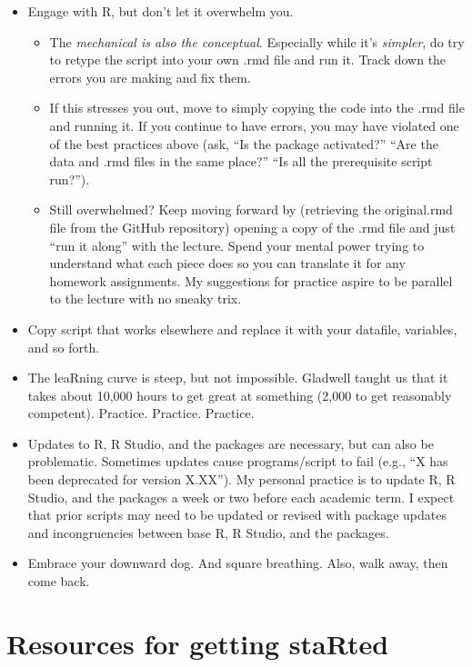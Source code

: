 \documentclass[
  11pt,
]{book}
\providecommand{\tightlist}{%
  \setlength{\itemsep}{0pt}\setlength{\parskip}{0pt}}
\begin{document}
\begin{itemize}
\tightlist
\item
  Engage with R, but don't let it overwhelm you.

  \begin{itemize}
  \tightlist
  \item
    The \emph{mechanical is also the conceptual}. Especially while it's \emph{simpler}, do try to retype the script into your own .rmd file and run it. Track down the errors you are making and fix them.
  \item
    If this stresses you out, move to simply copying the code into the .rmd file and running it. If you continue to have errors, you may have violated one of the best practices above (ask, ``Is the package activated?'' ``Are the data and .rmd files in the same place?'' ``Is all the prerequisite script run?'').
  \item
    Still overwhelmed? Keep moving forward by (retrieving the original.rmd file from the GitHub repository) opening a copy of the .rmd file and just ``run it along'' with the lecture. Spend your mental power trying to understand what each piece does so you can translate it for any homework assignments. My suggestions for practice aspire to be parallel to the lecture with no sneaky trix.
  \end{itemize}
\item
  Copy script that works elsewhere and replace it with your datafile, variables, and so forth.
\item
  The leaRning curve is steep, but not impossible. Gladwell \citeyearpar{gladwell_outliers_2008} taught us that it takes about 10,000 hours to get great at something (2,000 to get reasonably competent). Practice. Practice. Practice.
\item
  Updates to R, R Studio, and the packages are necessary, but can also be problematic. Sometimes updates cause programs/script to fail (e.g., ``X has been deprecated for version X.XX''). My personal practice is to update R, R Studio, and the packages a week or two before each academic term. I expect that prior scripts may need to be updated or revised with package updates and incongruencies between base R, R Studio, and the packages.
\item
  Embrace your downward dog. And square breathing. Also, walk away, then come back.
\end{itemize}

\hypertarget{resources-for-getting-started}{%
\section{Resources for getting staRted}\label{resources-for-getting-started}}
\end{document}
